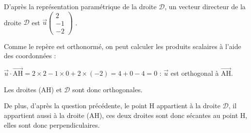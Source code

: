 \documentclass[10pt]{article}
\providecommand{\vect}[1]{\overrightarrow{#1}}
\begin{document}
\begin{enumerate}
D'après la représentation paramétrique de la droite $\mathcal{D}$,  un vecteur directeur de la droite $\mathcal{D}$ est $\vect{u}\begin{pmatrix}2\\-1\\-2 \end{pmatrix}$ .

Comme le repère est orthonormé,  on peut calculer les produits scalaires à l'aide des coordonnées :

$ \vect{u}\cdot \vect{\mathrm{AH}} = 2\times 2 - 1 \times 0 + 2 \times (-2) = 4 + 0 - 4 = 0$ : $\vect{u}$ est orthogonal à $ \vect{\mathrm{AH}}$.

Les droites (AH) et $\mathcal{D}$ sont donc orthogonales.

De plus, d'après la question précédente, le point H appartient à la droite $\mathcal{D}$, il appartient aussi à la droite (AH), ces deux droites sont donc sécantes au point H, elles sont donc perpendiculaires.
\end{enumerate}

\bigskip
\end{document}
